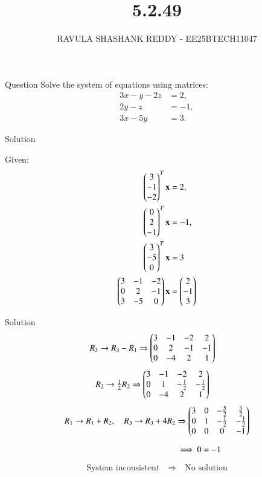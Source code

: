 \documentclass{beamer}
\title %
{5.2.49}
\author %
{RAVULA SHASHANK REDDY - EE25BTECH11047}
\begin{document}
	
	
	\frame{\titlepage}
	\begin{frame}{Question}
    Solve the system of equations using matrices:
\begin{align*}
3x - y - 2z &= 2, \\
2y - z &= -1, \\
3x - 5y &= 3.
\end{align*}

\end{frame}
\begin{frame}{Solution}

Given:
\begin{align}
\begin{pmatrix}3\\-1\\-2\end{pmatrix}^{T}\mathbf{x}&=2,\\
\begin{pmatrix}0\\2\\-1\end{pmatrix}^{T}\mathbf{x}&=-1,\\
\begin{pmatrix}3\\-5\\0\end{pmatrix}^{T}\mathbf{x}&=3\\
\begin{pmatrix}3 & -1 & -2  \\
0 & 2 & -1  \\
3 & -5 & 0 \end{pmatrix} \mathbf{x} &= \begin{pmatrix}2 \\ -1 \\ 3\end{pmatrix}
\end{align}
\end{frame}
\begin{frame}{Solution}
\begin{align}
R_3\rightarrow R_3-R_1 &\Rightarrow
\begin{pmatrix}3 & -1 & -2 & 2 \\
0 & 2 & -1 & -1 \\
0 & -4 & 2 & 1\end{pmatrix}
\end{align}
\begin{align}
R_2\rightarrow \tfrac{1}{2}R_2 &\Rightarrow
\begin{pmatrix}3 & -1 & -2 & 2 \\
0 & 1 & -\tfrac{1}{2} & -\tfrac{1}{2} \\
0 & -4 & 2 & 1\end{pmatrix}
\end{align}
\begin{align}
R_1\rightarrow R_1+R_2,\quad R_3\rightarrow R_3+4R_2 &\Rightarrow
\begin{pmatrix}3 & 0 & -\tfrac{5}{2} & \tfrac{3}{2} \\
0 & 1 & -\tfrac{1}{2} & -\tfrac{1}{2} \\
0 & 0 & 0 & -1\end{pmatrix}
\\[6pt]
&\implies 0=-1
\end{align}

\[
\text{System inconsistent}\quad\Rightarrow\quad\boxed{\text{No solution}}
\]

    
\end{frame}
\end{document}
